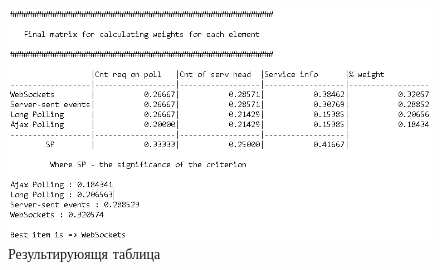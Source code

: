 \begin{figure}
	\centering
	\includegraphics[width=1\linewidth]{my_folder/images/ATransferData3}
	\caption{Результируюящя таблица}
	\label{fig:atransferdata3}
\end{figure}